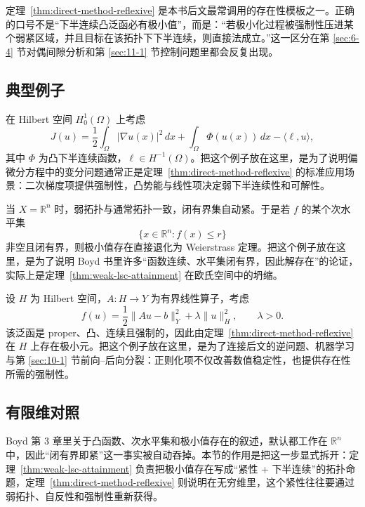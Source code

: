 \begin{remark}
定理~\ref{thm:direct-method-reflexive} 是本书后文最常调用的存在性模板之一。正确的口号不是“下半连续凸泛函必有极小值”，而是：“若极小化过程被强制性压进某个弱紧区域，并且目标在该拓扑下下半连续，则直接法成立。”这一区分在第 \ref{sec:6-4} 节对偶间隙分析和第 \ref{sec:11-1} 节控制问题里都会反复出现。
\end{remark}

\subsection{典型例子}

\begin{example}\label{ex:sobolev-energy-functional}
在 Hilbert 空间 $H_0^1(\Omega)$ 上考虑
\[
J(u)=\frac12\int_\Omega |\nabla u(x)|^2\,dx+\int_\Omega \Phi(u(x))\,dx-\langle \ell,u\rangle,
\]
其中 $\Phi$ 为凸下半连续函数，$\ell\in H^{-1}(\Omega)$。把这个例子放在这里，是为了说明偏微分方程中的变分问题通常正是定理~\ref{thm:direct-method-reflexive} 的标准应用场景：二次梯度项提供强制性，凸势能与线性项决定弱下半连续性和可解性。
\end{example}

\begin{example}[有限维闭有界水平集]\label{ex:finite-dimensional-level-set}
当 $X=\mathbb R^n$ 时，弱拓扑与通常拓扑一致，闭有界集自动紧。于是若 $f$ 的某个次水平集
\[
\{x\in\mathbb R^n:f(x)\le r\}
\]
非空且闭有界，则极小值存在直接退化为 Weierstrass 定理。把这个例子放在这里，是为了说明 Boyd 书里许多“函数连续、水平集闭有界，因此解存在”的论证，实际上是定理~\ref{thm:weak-lsc-attainment} 在欧氏空间中的坍缩。
\end{example}

\begin{example}\label{ex:tikhonov-regularization}
设 $H$ 为 Hilbert 空间，$A\colon H\to Y$ 为有界线性算子，考虑
\[
f(u)=\frac12\|Au-b\|_Y^2+\lambda \|u\|_H^2,\qquad \lambda>0.
\]
该泛函是 proper、凸、连续且强制的，因此由定理~\ref{thm:direct-method-reflexive} 在 $H$ 上存在极小元。把这个例子放在这里，是为了连接后文的逆问题、机器学习与第 \ref{sec:10-1} 节前向--后向分裂：正则化项不仅改善数值稳定性，也提供存在性所需的强制性。
\end{example}

\subsection*{有限维对照}

Boyd 第 3 章里关于凸函数、次水平集和极小值存在的叙述，默认都工作在 $\mathbb R^n$ 中，因此“闭有界即紧”这一事实被自动吞掉。本节的作用是把这一步显式拆开：定理~\ref{thm:weak-lsc-attainment} 负责把极小值存在写成“紧性 + 下半连续”的拓扑命题，定理~\ref{thm:direct-method-reflexive} 则说明在无穷维里，这个紧性往往要通过弱拓扑、自反性和强制性重新获得。

